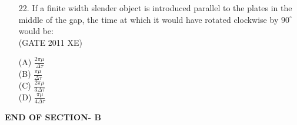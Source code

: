 \documentclass[journal,12pt,onecolumn]{IEEEtran}
\begin{document}
\begin{enumerate}
\item[22.] If a finite width slender object is introduced parallel to the plates in the middle of the gap, the time at which it would have rotated clockwise by $90^\circ$ would be:\\

\hfill{(GATE 2011 XE)} \\
\begin{multicols}{4}
(A) $\frac{2\pi\mu}{\Delta\tau}$\\
(B) $\frac{\pi\mu}{\Delta\tau}$\\
(C) $\frac{2\pi\mu}{3\Delta\tau}$\\
(D) $\frac{\pi\mu}{4\Delta\tau}$
\end{multicols}

\end{enumerate}

\vspace{1\baselineskip}
    \begin{center}
    \textbf{\Large END OF SECTION- B}
    \end{center}


\newpage
\end{document}
